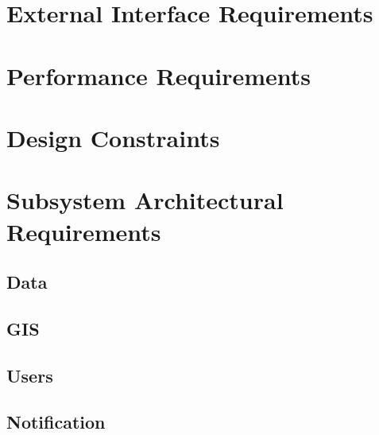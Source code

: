 \documentclass{article}
\begin{document}
\section{External Interface Requirements}
\section{Performance Requirements}
\section{Design Constraints}
\section{Subsystem Architectural Requirements}
  \subsection{Data}
  \subsection{GIS}
  \subsection{Users}
  \subsection{Notification}
\end{document}
